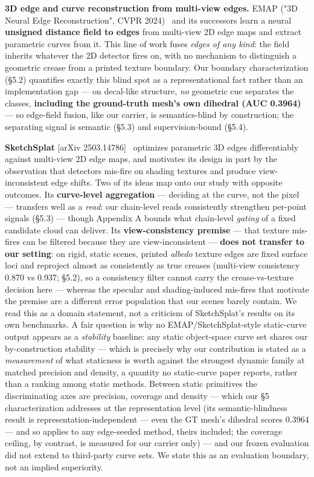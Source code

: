 \textbf{3D edge and curve reconstruction from multi-view edges.} EMAP ("3D Neural Edge
Reconstruction", CVPR 2024)~\cite{emap} and its successors learn a neural \textbf{unsigned distance field to
edges} from multi-view 2D edge maps and extract parametric curves from it. This line of work fuses \emph{edges of any kind}: the field
inherits whatever the 2D detector fires on, with no mechanism to distinguish a geometric
crease from a printed texture boundary. Our boundary characterization (\S5.2) quantifies
exactly this blind spot as a representational fact rather than an implementation gap ---
on decal-like structure, \emph{no} geometric cue separates the classes, \textbf{including the
ground-truth mesh's own dihedral (AUC 0.3964)} --- so edge-field fusion, like our carrier,
is semantics-blind by construction; the separating signal is semantic (\S5.3) and
supervision-bound (\S5.4).

\textbf{SketchSplat} [arXiv 2503.14786]~\cite{sketchsplat} optimizes parametric 3D edges differentiably against
multi-view 2D edge maps, and motivates its design in part by the observation that
detectors mis-fire on shading textures and produce view-inconsistent edge shifts. Two of
its ideas map onto our study with opposite outcomes. Its \textbf{curve-level aggregation} ---
deciding at the curve, not the pixel --- transfers well as a \emph{read}: our chain-level reads
consistently strengthen per-point signals (\S5.3) --- though Appendix A bounds what
chain-level \emph{gating} of a fixed candidate cloud can deliver. Its \textbf{view-consistency premise} --- that texture
mis-fires can be filtered because they are view-inconsistent --- \textbf{does not transfer to our
setting}: on rigid, static scenes, printed \emph{albedo} texture edges are fixed surface loci
and reproject almost as consistently as true creases (multi-view consistency 0.870 vs
0.937; \S5.2), so a consistency filter cannot carry the crease-vs-texture decision here ---
whereas the specular and shading-induced mis-fires that motivate the premise are a
different error population that our scenes barely contain. We read this as a domain statement, not a criticism of SketchSplat's results on its own
benchmarks. A fair question is why no EMAP/SketchSplat-style static-curve output appears
as a \emph{stability} baseline: any static object-space curve set shares our by-construction
stability --- which is precisely why our contribution is stated as a \emph{measurement} of what
staticness is worth against the strongest dynamic family at matched precision and density,
a quantity no static-curve paper reports, rather than a ranking among static methods.
Between static primitives the discriminating axes are precision, coverage and density --- which our \S5 characterization addresses at the representation level (its
semantic-blindness result is representation-independent --- even the GT mesh's dihedral
scores 0.3964 --- and so applies to any edge-seeded method, theirs included; the coverage
ceiling, by contrast, is measured for our carrier only)
--- and our frozen evaluation did not extend to third-party curve sets. We state this as an
evaluation boundary, not an implied superiority.

